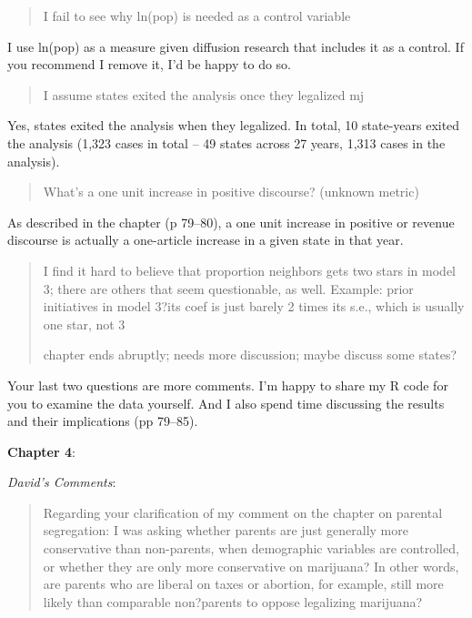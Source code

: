 \documentclass[12pt,stdletter,dateno,sigleft]{newlfm} %
\begin{document}
\begin{newlfm}
\begin{quotation}{\color{red}\noindent \footnotesize
I fail to see why ln(pop) is needed as a control variable
}
\end{quotation}


I use ln(pop) as a measure given diffusion research that includes it as a control. If you recommend I remove it, I'd be happy to do so. 


\begin{quotation}{\color{red}\noindent \footnotesize
I assume states exited the analysis once they legalized mj
}
\end{quotation}

Yes, states exited the analysis when they legalized. In total, 10 state-years exited the analysis (1,323 cases in total -- 49 states across 27 years, 1,313 cases in the analysis). 

\begin{quotation}{\color{red}\noindent \footnotesize
What's a one unit increase in positive discourse? (unknown metric)
}
\end{quotation}

As described in the chapter (p 79--80), a one unit increase in positive or revenue discourse is actually a one-article increase in a given state in that year. 


\begin{quotation}{\color{red}\noindent \footnotesize
I find it hard to believe that proportion neighbors gets two stars in model 3; there are others that seem questionable, as well. Example: prior initiatives in model 3?its coef is just barely 2 times its s.e., which is usually one star, not 3 \newline


\noindent chapter ends abruptly; needs more discussion; maybe discuss some states?
}
\end{quotation}

Your last two questions are more comments. I'm happy to share my R code for you to examine the data yourself. And I also spend time discussing the results and their implications (pp 79--85). \newline


\textbf{Chapter 4}: 

\textit{David's Comments}:

\begin{quotation}{\color{red}\noindent \footnotesize
Regarding your clarification of my comment on the chapter on parental segregation: I was asking whether parents are just generally more conservative than non-parents, when demographic variables are controlled, or whether they are only more conservative on marijuana? In other words, are parents who are liberal on taxes or abortion, for example, still more likely than comparable non?parents to oppose legalizing marijuana?
}
\end{quotation}




\end{newlfm}
\end{document}
